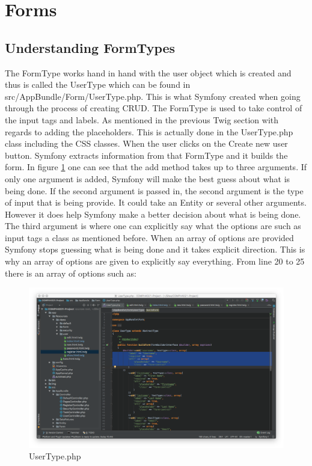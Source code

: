 \section{Forms}

\subsection{Understanding FormTypes}

The FormType works hand in hand with the user object which is created and thus is called the UserType which can be found in src/AppBundle/Form/UserType.php. This is what Symfony created when going through the process of creating CRUD. The FormType is used to take control of the input tags and labels. As mentioned in the previous Twig section with regards to adding the placeholders. This is actually done in the UserType.php class including the CSS classes. When the user clicks on the Create new user button. Symfony extracts information from that FormType and it builds the form. In figure \ref{fig:UserType.php} one can see that the add method takes up to three arguments. If only one argument is added, Symfony will make the best guess about what is being done. If the second argument is passed in, the second argument is the type of input that is being provide. It could take an Entity or several other arguments. However it does help Symfony make a better decision about what is being done. The third argument is where one can explicitly say what the options are such as input tags a class as mentioned before. When an array of options are provided Symfony stops guessing what is being done and it takes explicit direction. This is why an array of options are given to explicitly say everything. From line 20 to 25 there is an array of options such as:

\begin{figure}[htbp]
   \centering
   \includegraphics[width=400pt]{figures/userType.png} %
   \caption{UserType.php}
   \label{fig:UserType.php}
\end{figure}

